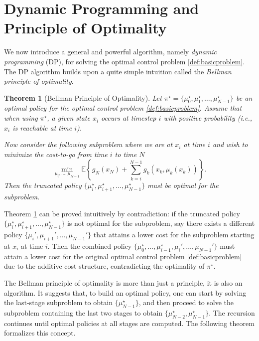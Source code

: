 \documentclass[
]{book}
\newtheorem{theorem}{Theorem}[chapter]
\theoremstyle{definition}
\theoremstyle{definition}
\theoremstyle{definition}
\theoremstyle{definition}
\theoremstyle{remark}
\begin{document}
\hypertarget{dynamic-programming-and-principle-of-optimality}{%
\section{Dynamic Programming and Principle of Optimality}\label{dynamic-programming-and-principle-of-optimality}}

We now introduce a general and powerful algorithm, namely \emph{dynamic programming} (DP), for solving the optimal control problem \ref{def:basicproblem}. The DP algorithm builds upon a quite simple intuition called the \emph{Bellman principle of optimality}.

\begin{theorem}[Bellman Principle of Optimality]
\protect\hypertarget{thm:bellmanoptimality}{}\label{thm:bellmanoptimality}Let \(\pi^\star = \{ \mu_0^\star,\mu_1^\star,\dots,\mu_{N-1}^\star \}\) be an optimal policy for the optimal control problem \ref{def:basicproblem}. Assume that when using \(\pi^\star\), a given state \(x_i\) occurs at timestep \(i\) with positive probability (i.e., \(x_i\) is reachable at time \(i\)).

Now consider the following subproblem where we are at \(x_i\) at time \(i\) and wish to minimize the cost-to-go from time \(i\) to time \(N\)
\[
\min_{\mu_i,\dots,\mu_{N-1}} \mathbb{E} \left\{ g_N(x_N) + \sum_{k=i}^{N-1} g_k (x_k, \mu_k(x_k)) \right\}.
\]
Then the truncated policy \(\{\mu^\star_i,\mu^\star_{i+1},\dots, \mu^\star_{N-1}\}\) must be optimal for the subproblem.
\end{theorem}

Theorem \ref{thm:bellmanoptimality} can be proved intuitively by contradiction: if the truncated policy \(\{\mu^\star_i,\mu^\star_{i+1},\dots, \mu^\star_{N-1}\}\) is not optimal for the subproblem, say there exists a different policy \(\{\mu_i',\mu_{i+1}',\dots, \mu_{N-1}'\}\) that attains a lower cost for the subproblem starting at \(x_i\) at time \(i\). Then the combined policy \(\{\mu_0^\star,\dots,\mu^\star_{i-1},\mu_i',\dots,\mu_{N-1}'\}\) must attain a lower cost for the original optimal control problem \ref{def:basicproblem} due to the additive cost structure, contradicting the optimality of \(\pi^\star\).

The Bellman principle of optimality is more than just a principle, it is also an algorithm. It suggests that, to build an optimal policy, one can start by solving the last-stage subproblem to obtain \(\{\mu^\star_{N-1} \}\), and then proceed to solve the subproblem containing the last two stages to obtain \(\{ \mu^\star_{N-2},\mu^\star_{N-1} \}\). The recursion continues until optimal policies at all stages are computed. The following theorem formalizes this concept.
\end{document}
